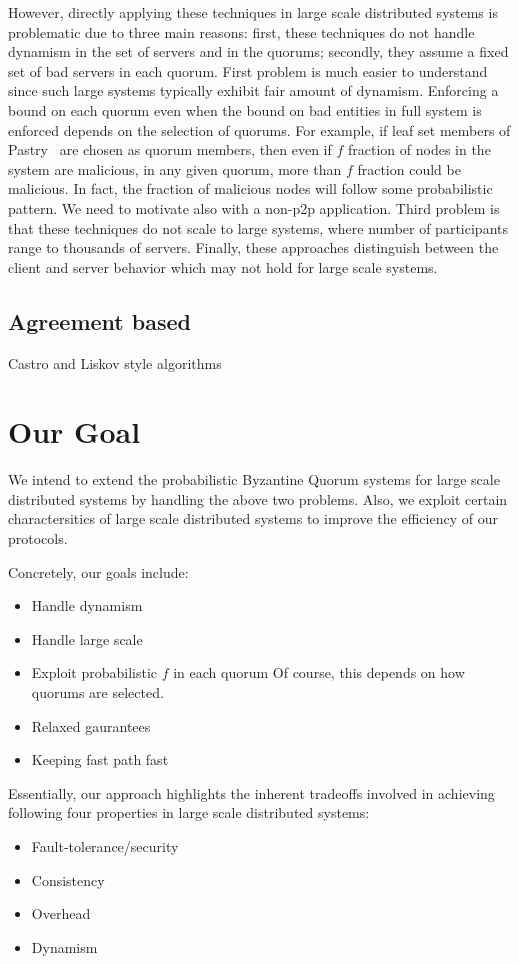 However, directly applying these techniques in large scale distributed systems is problematic due to three main reasons: first, these techniques do not handle dynamism in the set of servers and in the quorums; secondly, they assume a fixed set of bad servers in each quorum. First problem is much easier to understand since such large systems typically exhibit fair amount of dynamism. Enforcing a bound on each quorum even when the bound on bad entities in full system is enforced depends on the selection of quorums. For example, if leaf set members of Pastry~\cite{} are chosen as quorum members, then even if $f$ fraction of nodes in the system are malicious, in any given quorum, more than $f$ fraction could be malicious. In fact, the fraction of  malicious nodes will follow some probabilistic pattern. We need to motivate also with a non-p2p application. Third problem is that these techniques do not scale to large systems, where number of participants range to thousands of servers. Finally, these approaches distinguish between the client and server behavior which may not hold for large scale systems. 
 
\subsection{Agreement based} 
 
Castro and Liskov style algorithms 
 
\section{Our Goal} 
 
We intend to extend the probabilistic Byzantine Quorum systems for large scale distributed systems by handling the above two problems. Also, we exploit certain charactersitics of large scale distributed systems to improve the efficiency of our protocols.  
 
Concretely, our goals include: 
\begin{itemize} 
\item{Handle dynamism} 
\item{Handle large scale} 
\item{Exploit probabilistic $f$ in each quorum} Of course, this depends on how quorums are selected. 
\item{Relaxed gaurantees}  
\item{Keeping fast path fast}  
\end{itemize} 
 
Essentially, our approach highlights the inherent tradeoffs involved in achieving following four properties in large scale distributed systems: 
\begin{itemize} 
\item{Fault-tolerance/security} 
\item{Consistency} 
\item{Overhead} 
\item{Dynamism} 
\end{itemize} 
 
